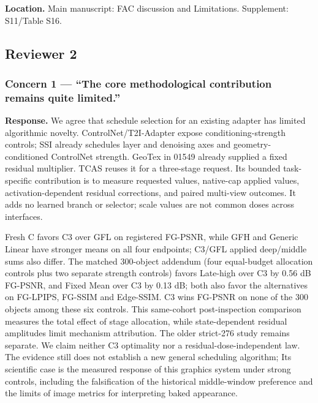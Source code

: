 \documentclass[
  10pt,
]{article}
\begin{document}
\textbf{Location.} Main manuscript: FAC discussion and Limitations.
Supplement: S11/Table S16.

\hypertarget{reviewer-2}{%
\subsection{Reviewer 2}\label{reviewer-2}}

\hypertarget{concern-1-the-core-methodological-contribution-remains-quite-limited.}{%
\subsubsection{Concern 1 --- ``The core methodological contribution
remains quite
limited.''}\label{concern-1-the-core-methodological-contribution-remains-quite-limited.}}

\textbf{Response.} We agree that schedule selection for an existing
adapter has limited algorithmic novelty. ControlNet/T2I-Adapter expose
conditioning-strength controls; SSI already schedules layer and
denoising axes and geometry-conditioned ControlNet strength. GeoTex in
01549 already supplied a fixed residual multiplier. TCAS reuses it for a
three-stage request. Its bounded task-specific contribution is to
measure requested values, native-cap applied values,
activation-dependent residual corrections, and paired multi-view
outcomes. It adds no learned branch or selector; scale values are not
common doses across interfaces.

Fresh C favors C3 over GFL on registered FG-PSNR, while GFH and Generic
Linear have stronger means on all four endpoints; C3/GFL applied
deep/middle sums also differ. The matched 300-object addendum (four
equal-budget allocation controls plus two separate strength controls)
favors Late-high over C3 by 0.56 dB FG-PSNR, and Fixed Mean over C3 by
0.13 dB; both also favor the alternatives on FG-LPIPS, FG-SSIM and
Edge-SSIM. C3 wins FG-PSNR on none of the 300 objects among these six
controls. This same-cohort post-inspection comparison measures the total
effect of stage allocation, while state-dependent residual amplitudes
limit mechanism attribution. The older strict-276 study remains
separate. We claim neither C3 optimality nor a residual-dose-independent
law. The evidence still does not establish a new general scheduling
algorithm; Its scientific case is the measured response of this graphics
system under strong controls, including the falsification of the
historical middle-window preference and the limits of image metrics for
interpreting baked appearance.
\end{document}

